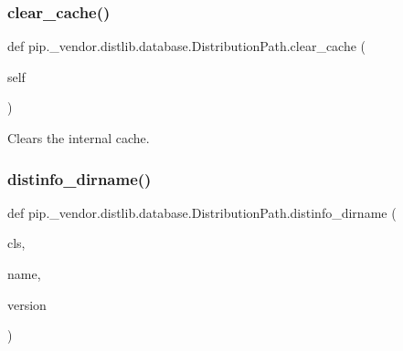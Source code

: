 \subsubsection{\texorpdfstring{clear\+\_\+cache()}{clear\_cache()}}
{\footnotesize\ttfamily def pip.\+\_\+vendor.\+distlib.\+database.\+Distribution\+Path.\+clear\+\_\+cache (\begin{DoxyParamCaption}\item[{}]{self }\end{DoxyParamCaption})}

\begin{DoxyVerb}Clears the internal cache.
\end{DoxyVerb}
 \mbox{\label{classpip_1_1__vendor_1_1distlib_1_1database_1_1DistributionPath_a1500e9cf278065339a256b7a18a26aa1}} 
\subsubsection{\texorpdfstring{distinfo\+\_\+dirname()}{distinfo\_dirname()}}
{\footnotesize\ttfamily def pip.\+\_\+vendor.\+distlib.\+database.\+Distribution\+Path.\+distinfo\+\_\+dirname (\begin{DoxyParamCaption}\item[{}]{cls,  }\item[{}]{name,  }\item[{}]{version }\end{DoxyParamCaption})}

